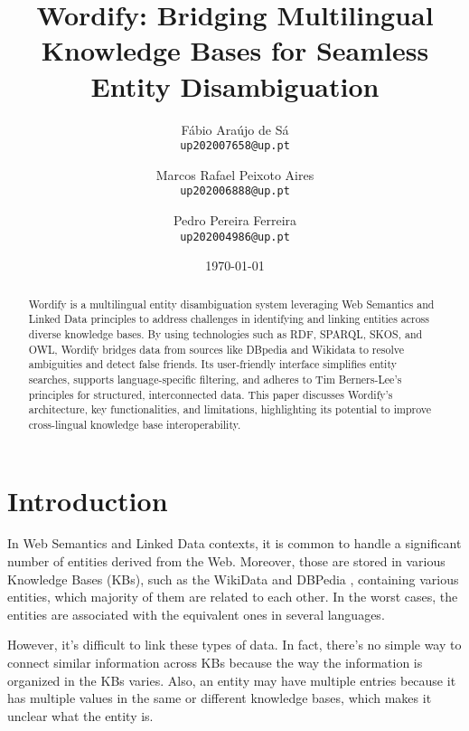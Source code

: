 \documentclass[twocolumn,twoside,11pt,a4paper]{article}
\title{\vspace{-15mm}\fontsize{24pt}{10pt}\selectfont\textbf{Wordify: Bridging Multilingual Knowledge Bases for Seamless Entity Disambiguation}} %
\author{Fábio Araújo de Sá\\
\small \texttt{up202007658@up.pt}\\
\and
Marcos Rafael Peixoto Aires\\
\small \texttt{up202006888@up.pt}
\and
Pedro Pereira Ferreira\\
\small \texttt{up202004986@up.pt}
\vspace{-5mm}
}
\date{\today}
\begin{document}
\maketitle
\thispagestyle{plain}


\begin{abstract}

Wordify is a multilingual entity disambiguation system leveraging Web Semantics and Linked Data principles to address challenges in identifying and linking entities across diverse knowledge bases. By using technologies such as RDF, SPARQL, SKOS, and OWL, Wordify bridges data from sources like DBpedia and Wikidata to resolve ambiguities and detect false friends. Its user-friendly interface simplifies entity searches, supports language-specific filtering, and adheres to Tim Berners-Lee's principles for structured, interconnected data. This paper discusses Wordify’s architecture, key functionalities, and limitations, highlighting its potential to improve cross-lingual knowledge base interoperability.

\end{abstract}


\section{Introduction}\label{sec:intro}

In Web Semantics and Linked Data contexts, it is common to handle a significant number of entities derived from the Web. Moreover, those are stored in various Knowledge Bases (KBs), such as the WikiData \cite{wikidata} and DBPedia \cite{dbpedia}, containing various entities, which majority of them are related to each other. In the worst cases, the entities are associated with the equivalent ones in several languages.

However, it's difficult to link these types of data. In fact, there's no simple way to connect similar information across KBs because the way the information is organized in the KBs varies. Also, an entity may have multiple entries because it has multiple values in the same or different knowledge bases, which makes it unclear what the entity is.
\end{document}
